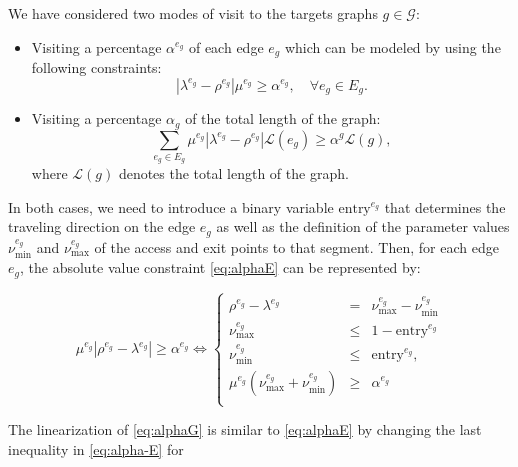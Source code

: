 \documentclass[10pt,a4paper]{article}
\newcommand{\CV}[1]{{\color{atomictangerine}#1}}
\begin{document}
We have considered two modes of visit to the targets graphs $g\in \mathcal{G}$:
\begin{itemize}
    \item Visiting a percentage $\alpha^{e_g}$ of each edge $e_g$ which can be modeled by using the following constraints:
    \begin{equation}\label{eq:alphaE}\tag{$\alpha$-E}
    |\lambda^{e_g} - \rho^{e_g}|\mu^{e_g}\geq \alpha^{e_g}, \quad \forall e_g\in E_g.
    \end{equation}
    \item Visiting a percentage $\alpha_g$ of the total length of the graph:
    \begin{equation}\label{eq:alphaG}\tag{$\alpha$-G}
    \sum_{e_g\in E_g} \mu^{e_g}|\lambda^{e_g} - \rho^{e_g}|\mathcal L(e_g) \geq \alpha^g\mathcal L(g),
    \end{equation}
    where $\mathcal L(g)$ denotes the total length of the graph.
\end{itemize}

\bigskip

In both cases, we need to introduce a binary variable \CV{$\text{entry}^{e_g}$} that determines the traveling direction on the edge $e_g$ as well as the definition of the parameter values $\nu_\text{min}^{e_g}$ and $\nu_\text{max}^{e_g}$ of the access and exit points to that segment. Then, for each edge $e_g$, the absolute value constraint \eqref{eq:alphaE} can be represented by:

\begin{equation}\label{eq:alpha-E}\tag{$\alpha$-E}
 \mu^{e_g}|\rho^{e_g}-\lambda^{e_g}|\geq \alpha^{e_g} \Longleftrightarrow
 \left\{
 \begin{array}{ccl}
  \rho^{e_g} - \lambda^{e_g}                       & =    & \nu_\text{max}^{e_g} - \nu_\text{min}^{e_g}                                     \\
  \nu_\text{max}^{e_g}                         & \leq & 1-{\text{entry}^{e_g}}                                    \\
  \nu_\text{min}^{e_g}                      & \leq & {  \text{entry}^{e_g}},                                        \\
  \mu^{e_g}(\nu_\text{max}^{e_g} + \nu_\text{min}^{e_g} ) & \geq & \alpha^{e_g}
  \\
 \end{array}
 \right.
\end{equation}

The linearization of \eqref{eq:alphaG} is similar to \eqref{eq:alphaE} by changing the last inequality in \eqref{eq:alpha-E} for
\end{document}
